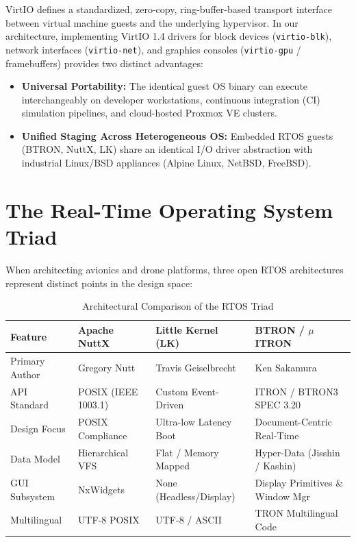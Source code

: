 \documentclass[10pt,journal,compsoc,twocolumn]{article}
\begin{document}
VirtIO defines a standardized, zero-copy, ring-buffer-based transport interface between virtual machine guests and the underlying hypervisor. In our architecture, implementing VirtIO 1.4 drivers for block devices (\texttt{virtio-blk}), network interfaces (\texttt{virtio-net}), and graphics consoles (\texttt{virtio-gpu} / framebuffers) provides two distinct advantages:
\begin{itemize}[leftmargin=*]
    \item \textbf{Universal Portability:} The identical guest OS binary can execute interchangeably on developer workstations, continuous integration (CI) simulation pipelines, and cloud-hosted Proxmox VE clusters.
    \item \textbf{Unified Staging Across Heterogeneous OS:} Embedded RTOS guests (BTRON, NuttX, LK) share an identical I/O driver abstraction with industrial Linux/BSD appliances (Alpine Linux, NetBSD, FreeBSD).
\end{itemize}

\section{The Real-Time Operating System Triad}
\label{sec:rtos_triad}

When architecting avionics and drone platforms, three open RTOS architectures represent distinct points in the design space:

\begin{table}[htbp]
\caption{Architectural Comparison of the RTOS Triad}
\label{tab:rtos_comparison}
\centering
\small
\begin{tabular}{@{}llll@{}}
\toprule
\textbf{Feature} & \textbf{Apache NuttX} & \textbf{Little Kernel (LK)} & \textbf{BTRON / $\mu$ITRON} \\
\midrule
Primary Author   & Gregory Nutt          & Travis Geiselbrecht        & Ken Sakamura \\
API Standard     & POSIX (IEEE 1003.1)   & Custom Event-Driven        & ITRON / BTRON3 SPEC 3.20 \\
Design Focus     & POSIX Compliance      & Ultra-low Latency Boot     & Document-Centric Real-Time \\
Data Model       & Hierarchical VFS      & Flat / Memory Mapped       & Hyper-Data (Jisshin / Kashin) \\
GUI Subsystem    & NxWidgets             & None (Headless/Display)    & Display Primitives \& Window Mgr \\
Multilingual     & UTF-8 POSIX           & UTF-8 / ASCII              & TRON Multilingual Code \\
\bottomrule
\end{tabular}
\end{table}
\end{document}

